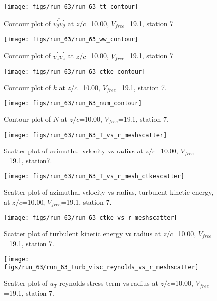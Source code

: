 \begin{figure}[H]
\centering
\texttt{[image: figs/run\_63/run\_63\_tt\_contour]}
\caption{Contour plot of $\overline{v_{\theta}^{\prime} v_{\theta}^{\prime}}$ at $z/c$=10.00, $V_{free}$=19.1, station 7.}
\end{figure}


\begin{figure}[H]
\centering
\texttt{[image: figs/run\_63/run\_63\_ww\_contour]}
\caption{Contour plot of $\overline{v_{z}^{\prime} v_{z}^{\prime}}$ at $z/c$=10.00, $V_{free}$=19.1, station 7.}
\end{figure}


\begin{figure}[H]
\centering
\texttt{[image: figs/run\_63/run\_63\_ctke\_contour]}
\caption{Contour plot of $k$ at $z/c$=10.00, $V_{free}$=19.1, station 7.}
\end{figure}


\begin{figure}[H]
\centering
\texttt{[image: figs/run\_63/run\_63\_num\_contour]}
\caption{Contour plot of $N$ at $z/c$=10.00, $V_{free}$=19.1, station 7.}
\end{figure}


\begin{figure}[H]
\centering
\texttt{[image: figs/run\_63/run\_63\_T\_vs\_r\_meshscatter]}
\caption{Scatter plot of azimuthal velocity vs radius at $z/c$=10.00, $V_{free}$=19.1, station7.}
\end{figure}


\begin{figure}[H]
\centering
\texttt{[image: figs/run\_63/run\_63\_T\_vs\_r\_mesh\_ctkescatter]}
\caption{Scatter plot of azimuthal velocity vs radius, turbulent kinetic energy, at $z/c$=10.00, $V_{free}$=19.1, station 7.}
\end{figure}


\begin{figure}[H]
\centering
\texttt{[image: figs/run\_63/run\_63\_ctke\_vs\_r\_meshscatter]}
\caption{Scatter plot of turbulent kinetic energy vs radius at $z/c$=10.00, $V_{free}$=19.1, station 7.}
\end{figure}


\begin{figure}[H]
\centering
\texttt{[image: figs/run\_63/run\_63\_turb\_visc\_reynolds\_vs\_r\_meshscatter]}
\caption{Scatter plot of $
u_T$ reynolds stress term vs radius at $z/c$=10.00, $V_{free}$=19.1, station 7.}
\end{figure}


